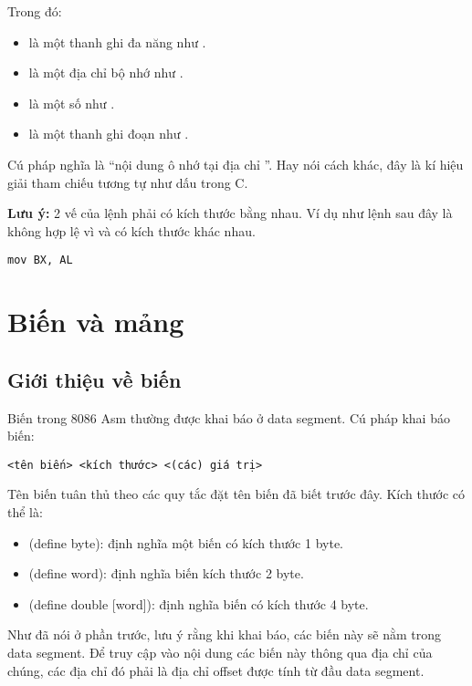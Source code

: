 \documentclass[main.tex]{subfiles}
\begin{document}
Trong đó:
\begin{itemize}
    \item {} là một thanh ghi đa năng như .
    \item {} là một địa chỉ bộ nhớ như \cd{[0DEADh], [0BEEFh], [0CAFEh], [BX], [DX]}.
    \item {} là một số như .
    \item {} là một thanh ghi đoạn như .
\end{itemize}

Cú pháp \cd{[memory]} nghĩa là ``nội dung ô nhớ tại địa chỉ ''. Hay nói cách khác, đây là kí hiệu giải tham chiếu tương tự như dấu \cd{*} trong C.

\textbf{Lưu ý:} 2 vế của lệnh  phải có kích thước bằng nhau. Ví dụ như lệnh sau đây là không hợp lệ vì  và  có kích thước khác nhau.
\begin{verbatim}
mov BX, AL
\end{verbatim}

\section{Biến và mảng}
\subsection{Giới thiệu về biến}
Biến trong 8086 Asm thường được khai báo ở data segment.
Cú pháp khai báo biến:
\begin{verbatim}
<tên biến> <kích thước> <(các) giá trị>
\end{verbatim}

Tên biến tuân thủ theo các quy tắc đặt tên biến đã biết trước đây.
Kích thước có thể là:
\begin{itemize}
    \item {} (define byte): định nghĩa một biến có kích thước 1 byte.
    \item {} (define word): định nghĩa biến kích thước 2 byte.
    \item {} (define double [word]): định nghĩa biến có kích thước 4 byte.
\end{itemize}

Như đã nói ở phần trước, lưu ý rằng khi khai báo, các biến này sẽ nằm trong data segment. Để truy cập vào nội dung các biến này thông qua địa chỉ của chúng, các địa chỉ đó phải là địa chỉ offset được tính từ đầu data segment.
\end{document}
